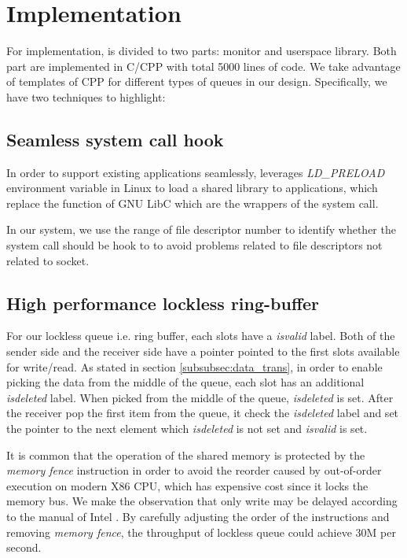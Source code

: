 \section{Implementation}
\label{sec:implementation}

For implementation, \libipc is divided to two parts: monitor and userspace library. Both part are implemented in C/CPP with total 5000 lines of code. We take advantage of templates of CPP for different types of queues in our design. Specifically, we have two techniques to highlight:
\subsection{Seamless system call hook}
\label{subsec:syscall-hook}
In order to support existing applications seamlessly, \libipc leverages \textit{LD\_PRELOAD} environment variable in Linux to load a shared library to applications, which replace the function of GNU LibC which are the wrappers of the system call. 

In our system, we use the range of file descriptor number to identify whether the system call should be hook to \libipc to avoid problems related to file descriptors not related to socket.

\subsection{High performance lockless ring-buffer}

For our lockless queue i.e. ring buffer, each slots have a \textit{isvalid} label. Both of the sender side and the receiver side have a pointer pointed to the first slots available for write/read. As stated in section \ref{subsubsec:data_trans}, in order to enable picking the data from the middle of the queue, each slot has an additional \textit{isdeleted} label. When picked from the middle of the queue, \textit{isdeleted} is set. After the receiver pop the first item from the queue, it check the \textit{isdeleted} label and set the pointer to the next element which \textit{isdeleted} is not set and \textit{isvalid} is set.

It is common that the operation of the shared memory is protected by the \textit{memory fence} instruction in order to avoid the reorder caused by out-of-order execution on modern X86 CPU, which has expensive cost since it locks the memory bus. We make the observation that only write may be delayed according to the manual of Intel \cite{sewell2010x86,intel-manual}. By carefully adjusting the order of the instructions and removing \textit{memory fence}, the throughput of lockless queue could achieve 30M per second. 

